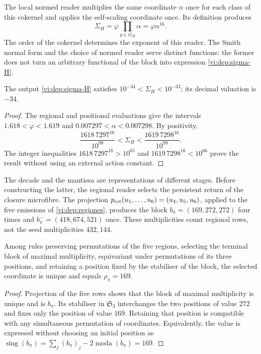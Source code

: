 The local normed reader multiplies the same coordinate \(\alpha\)
once for each class of this cokernel and applies the self-scaling
coordinate once. Its definition produces
\begin{equation}
 \Sigma_H=\varphi\prod_{g\in G_H}\alpha
         =\varphi\alpha^{16}.
 \label{vi:dep:sigma-H}
\end{equation}
The order of the cokernel determines the exponent of this reader. The Smith
normal form and the choice of normed reader serve distinct
functions: the former does not turn an arbitrary functional of the block into
expression \eqref{vi:dep:sigma-H}.

\begin{proposition}
\label{vi:dep:decada}
The output \eqref{vi:dep:sigma-H} satisfies
\(10^{-34}<\Sigma_H<10^{-33}\); its decimal valuation is \(-34\).
\end{proposition}
\begin{proof}
The regional and positional evaluations give the intervals
\(1.618<\varphi<1.619\) and \(0.007297<\alpha<0.007298\).
By positivity,
\[
 \frac{1618\,7297^{16}}{10^{99}}
 <\Sigma_H<
 \frac{1619\,7298^{16}}{10^{99}}.
\]
The integer inequalities
\(1618\,7297^{16}>10^{65}\) and
\(1619\,7298^{16}<10^{66}\) prove the result without using an
external action constant.
\end{proof}

The decade and the mantissa are representations of different stages.
Before constructing the latter, the regional reader selects the persistent
return of the closure microfibre. The projection
\(p_{\rm ret}(u_1,\ldots,u_6)=(u_4,u_5,u_6)\), applied to the
five emissions of \ref{vi:dep:regiones}, produces the block
\(b_\pi=(169,272,272)\) four times and
\(b_\pi^-=(418,674,521)\) once. These multiplicities count
regional rows, not the seed multiplicities \(432,144\).

\begin{proposition}
\label{vi:dep:selector169}
Among rules preserving permutations of the five regions,
selecting the terminal block of maximal multiplicity, equivariant
under permutations of its three positions, and retaining a position fixed
by the stabiliser of the block, the selected coordinate is unique
and equals \(\rho_\pi=169\).
\end{proposition}
\begin{proof}
Projection of the five rows shows that the block of maximal
multiplicity is unique and is \(b_\pi\). Its stabiliser in
\(\mathfrak S_3\) interchanges the two positions of value \(272\)
and fixes only the position of value \(169\). Retaining that position
is compatible with any simultaneous permutation of coordinates.
Equivalently, the value is expressed without choosing an initial position
as
\(\operatorname{sing}(b_\pi)=\sum_j(b_\pi)_j
-2\operatorname{moda}(b_\pi)=169\).
\end{proof}

